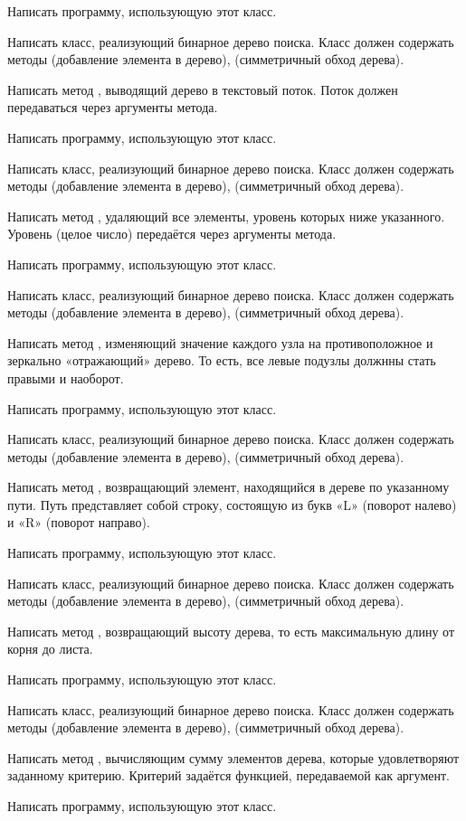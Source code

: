 Написать программу, использующую этот класс.

\task Написать класс, реализующий бинарное дерево поиска. Класс должен
содержать методы  (добавление элемента в дерево),
 (симметричный обход дерева).

Написать метод , выводящий дерево в текстовый поток. Поток
должен передаваться через аргументы метода.

Написать программу, использующую этот класс.

\task Написать класс, реализующий бинарное дерево поиска. Класс должен
содержать методы  (добавление элемента в дерево),
 (симметричный обход дерева).

Написать метод , удаляющий все элементы, уровень которых
ниже указанного. Уровень (целое число) передаётся через аргументы
метода.

Написать программу, использующую этот класс.

\task Написать класс, реализующий бинарное дерево поиска. Класс должен
содержать методы  (добавление элемента в дерево),
 (симметричный обход дерева).

Написать метод , изменяющий значение каждого узла на
противоположное и зеркально «отражающий» дерево. То есть, все
левые подузлы должнны стать правыми и наоборот.

Написать программу, использующую этот класс.

\task Написать класс, реализующий бинарное дерево поиска. Класс должен
содержать методы  (добавление элемента в дерево),
 (симметричный обход дерева).

Написать метод , возвращающий элемент, находящийся в
дереве по указанному пути. Путь представляет собой
строку, состоящую из букв «L» (поворот налево) и «R» (поворот
направо).

Написать программу, использующую этот класс.

\task Написать класс, реализующий бинарное дерево поиска. Класс должен
содержать методы  (добавление элемента в дерево),
 (симметричный обход дерева).

Написать метод , возвращающий высоту дерева, то есть
максимальную длину от корня до листа.

Написать программу, использующую этот класс.

\task Написать класс, реализующий бинарное дерево поиска. Класс должен
содержать методы  (добавление элемента в дерево),
 (симметричный обход дерева).

Написать метод , вычисляющим сумму элементов дерева, которые
удовлетворяют заданному критерию. Критерий задаётся функцией,
передаваемой как аргумент.

Написать программу, использующую этот класс.